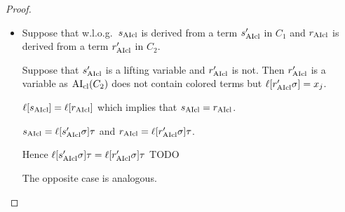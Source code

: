 \documentclass[,%
	paper=a4,%
	DIV14, 
	liststotoc,
	bibtotoc,
	draft=false,%
	numbers=noendperiod
]{scrartcl}
\begin{document}
\begin{proof}
\begin{itemize}
		\item Suppose that w.l.o.g.\ $s_{\operatorname{AIcl}}$ is derived from a term $s_{\operatorname{AIcl}}'$ in $C_1$ and $r_{\operatorname{AIcl}}$ is derived from a term $r_{\operatorname{AIcl}}'$ in $C_2$.

			Suppose that $s_{\operatorname{AIcl}}'$ is a lifting variable and $r_{\operatorname{AIcl}}'$ is not. 
			Then $r_{\operatorname{AIcl}}'$ is a variable as $\operatorname{AI}_\mathrm{cl}(C_2)$ does not contain colored terms but $\ell[r_{\operatorname{AIcl}}'\sigma] = x_j$.


			$\ell[s_{\operatorname{AIcl}}] = \ell[r_{\operatorname{AIcl}}]$ which implies that $s_{\operatorname{AIcl}} = r_{\operatorname{AIcl}}$.
			
			$s_{\operatorname{AIcl}} = \ell[s_{\operatorname{AIcl}}'\sigma]\tau$ and
			$r_{\operatorname{AIcl}} = \ell[r_{\operatorname{AIcl}}'\sigma]\tau$.

			Hence $\ell[s_{\operatorname{AIcl}}'\sigma]\tau = \ell[r_{\operatorname{AIcl}}'\sigma]\tau$
			TODO
			
			The opposite case is analogous.

	\end{itemize}

\end{proof}
\end{document}
